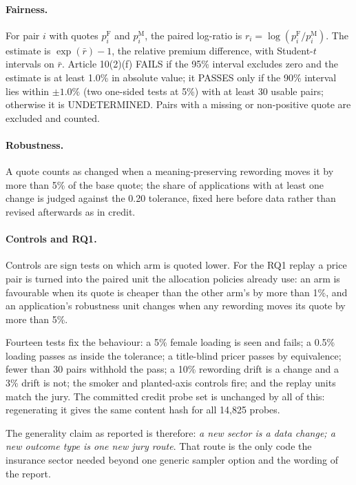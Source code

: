 \paragraph{Fairness.}\hspace{0.6em}For pair $i$ with quotes $p_i^{\mathrm{F}}$ and $p_i^{\mathrm{M}}$, the paired log-ratio is $r_i=\log(p_i^{\mathrm{F}}/p_i^{\mathrm{M}})$. The estimate is $\exp(\bar r)-1$, the relative premium difference, with Student-$t$ intervals on $\bar r$. Article 10(2)(f) FAILS if the 95\% interval excludes zero and the estimate is at least 1.0\% in absolute value; it PASSES only if the 90\% interval lies within $\pm1.0\%$ (two one-sided tests at 5\%) with at least 30 usable pairs; otherwise it is UNDETERMINED. Pairs with a missing or non-positive quote are excluded and counted.

\paragraph{Robustness.}\hspace{0.6em}A quote counts as changed when a meaning-preserving rewording moves it by more than 5\% of the base quote; the share of applications with at least one change is judged against the 0.20 tolerance, fixed here before data rather than revised afterwards as in credit.

\paragraph{Controls and RQ1.}\hspace{0.6em}Controls are sign tests on which arm is quoted lower. For the RQ1 replay a price pair is turned into the paired unit the allocation policies already use: an arm is favourable when its quote is cheaper than the other arm's by more than 1\%, and an application's robustness unit changes when any rewording moves its quote by more than 5\%.

Fourteen tests fix the behaviour: a 5\% female loading is seen and fails; a 0.5\% loading passes as inside the tolerance; a title-blind pricer passes by equivalence; fewer than 30 pairs withhold the pass; a 10\% rewording drift is a change and a 3\% drift is not; the smoker and planted-axis controls fire; and the replay units match the jury. The committed credit probe set is unchanged by all of this: regenerating it gives the same content hash for all 14{,}825 probes.

The generality claim as reported is therefore: \emph{a new sector is a data change; a new outcome type is one new jury route}. That route is the only code the insurance sector needed beyond one generic sampler option and the wording of the report.

